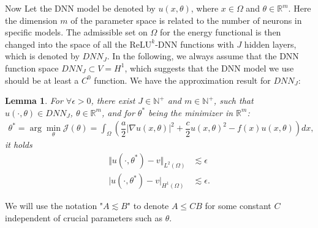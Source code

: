 \documentclass[a4paper, 11pt]{article}
\numberwithin{equation}{section}
\newtheorem{lemma}{\textbf{Lemma}}
\begin{document}
\quad\quad Now Let the DNN model be denoted by $u(x,\theta)$, where $x\in \Omega$ and $\theta \in \mathbb{R}^m$. Here the dimension $m$ of the parameter space is related to the number of neurons in specific models. The admissible set on $\Omega$ for the energy functional is then changed into the space of all the $\text{ReLU}^k$-DNN functions with $J$ hidden layers, which is denoted by $DNN_J$. In the following, we always assume that the DNN function space $DNN_J \subset V = H^1$, which suggests that the DNN model we use should be at least a $C^0$ function. We have the approximation result for $DNN_{J}$:

\begin{lemma}\label{lemma2}
For $\forall \epsilon > 0$, there exist $J\in \mathbb{N}^{+}$ and $m\in \mathbb{N}^{+}$, 
such that $u(\cdot,\theta) \in DNN_{J}$, $\theta\in \mathbb{R}^m$, and for $\theta^*$ being the minimizer in $\mathbb{R}^m$:
\begin{align}\label{thetaStar}
\theta^* = \arg\min_{\theta} \mathcal{J}(\theta) = \int_{\Omega} \left( \dfrac{a}{2} \vert\nabla u(x,\theta)\vert^2 + \dfrac{c}{2} u(x,\theta)^2 - f(x) u(x,\theta) \right) dx,
\end{align}
 it holds 
\begin{align}
\Vert u(\cdot,\theta^*) - v \Vert_{L^2(\Omega)} & \lesssim \epsilon \\
\big | u(\cdot,\theta^*) - v \big |_{H^1(\Omega)} & \lesssim \epsilon.
\end{align}
\end{lemma}

We will use the notation "$A \lesssim B$" to denote $A \leq C B$ for some constant $C$  independent of crucial parameters such as $\theta$.
\end{document}
